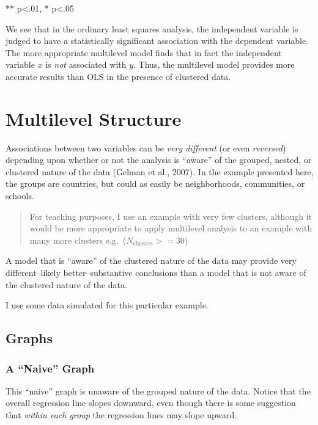\documentclass[
  letterpaper,
  DIV=11,
  numbers=noendperiod]{scrreprt}
\begin{document}
** p\textless.01, * p\textless.05

We see that in the ordinary least squares analysis, the independent
variable is judged to have a statistically significant association with
the dependent variable. The more appropriate multilevel model finds that
in fact the independent variable \(x\) is \emph{not} associated with
\(y\). Thus, the multilevel model provides more accurate results than
OLS in the presence of clustered data.

\hypertarget{sec-multilevelstructure}{%
\section{Multilevel Structure}\label{sec-multilevelstructure}}

Associations between two variables can be \emph{very different} (or even
\emph{reversed}) depending upon whether or not the analysis is ``aware''
of the grouped, nested, or clustered nature of the data (Gelman et al.,
2007). In the example presented here, the groups are countries, but
could as easily be neighborhoods, communities, or schools.

\begin{quote}
For teaching purposes, I use an example with very few clusters, although
it would be more appropriate to apply multilevel analysis to an example
with many more clusters e.g.~(\(N_\text{clusters} >= 30\))
\end{quote}

A model that is ``aware'' of the clustered nature of the data may
provide very different--likely better--substantive conclusions than a
model that is not aware of the clustered nature of the data.

I use some data simulated for this particular example.

\hypertarget{graphs}{%
\subsection{Graphs}\label{graphs}}

\hypertarget{a-naive-graph}{%
\subsubsection{A ``Naive'' Graph}\label{a-naive-graph}}

This ``naive'' graph is unaware of the grouped nature of the data.
Notice that the overall regression line slopes downward, even though
there is some suggestion that \emph{within each group} the regression
lines may slope upward.
\end{document}
